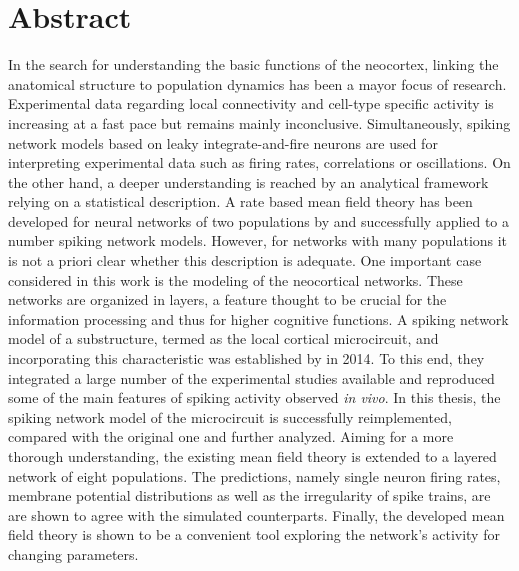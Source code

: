 \begingroup
\let\clearpage\relax
\let\cleardoublepage\relax
\let\cleardoublepage\relax

\section*{Abstract}
In the search for understanding the basic functions of the neocortex, 
linking the anatomical structure to population dynamics has been a mayor
focus of research. Experimental data regarding local connectivity
and cell-type specific activity is increasing at a fast pace but remains
mainly inconclusive. Simultaneously, spiking network models based on
leaky integrate-and-fire neurons 
are used for interpreting experimental data such as firing rates, 
correlations or oscillations. 
On the other hand, a deeper understanding is reached by 
an analytical framework relying on a statistical description.
A rate based mean field theory has been developed 
for neural networks of two populations
by  and successfully applied to a number 
spiking network models. However, for networks with many populations
it is not a priori clear whether this description is adequate. 
One important case considered in this work is the modeling of the neocortical networks. 
These networks are organized in layers, a feature thought to be 
crucial for the information processing 
and thus for higher cognitive functions.
A spiking network model
of a substructure, termed as the local cortical microcircuit, and
incorporating this characteristic
was established by  in 2014. 
To this end, they integrated a large number of the experimental studies 
available and reproduced some of the main features of spiking activity 
observed \textit{in vivo}.
In this thesis, the spiking network model of the microcircuit is successfully reimplemented, 
compared with the original one and further analyzed.
Aiming for a more thorough understanding,
the existing mean field theory is extended to a layered network of eight populations. 
The predictions, namely single neuron firing rates, 
membrane potential distributions as well as the irregularity of spike trains, 
are are shown to agree with the simulated counterparts.
Finally, the developed mean field theory is shown to be a convenient tool
exploring the network's activity for changing parameters. 

